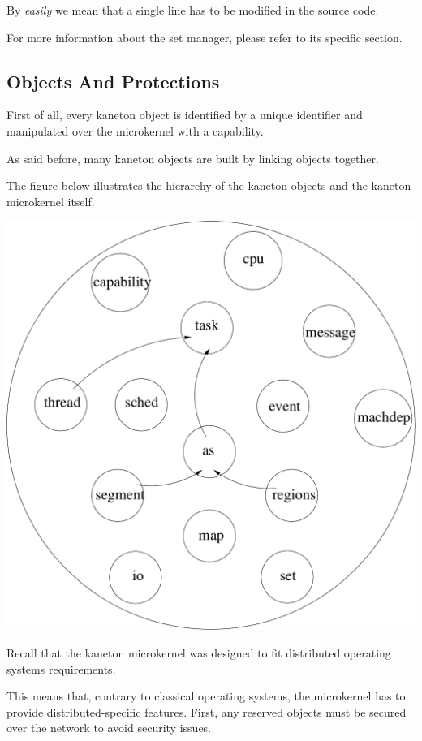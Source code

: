 \begin{multicols}{2}
By \textit{easily} we mean that a single line has to be modified in the
source code.

For more information about the set manager, please refer to its
specific section.

%
%

\subsection{Objects And Protections}

First of all, every kaneton object is identified by a unique identifier
and manipulated over the microkernel with a capability.

As said before, many kaneton objects are built by linking objects
together.

The figure below illustrates the hierarchy of the kaneton objects
and the kaneton microkernel itself.

\begin{center}
  \includegraphics[scale=0.35]{figures/kaneton.pdf}
\end{center}

Recall that the kaneton microkernel was designed to fit distributed
operating systems requirements.

This means that, contrary to classical operating systems, the microkernel
has to provide distributed-specific features. First, any reserved
objects must be secured over the network to avoid security issues.


\end{multicols}
